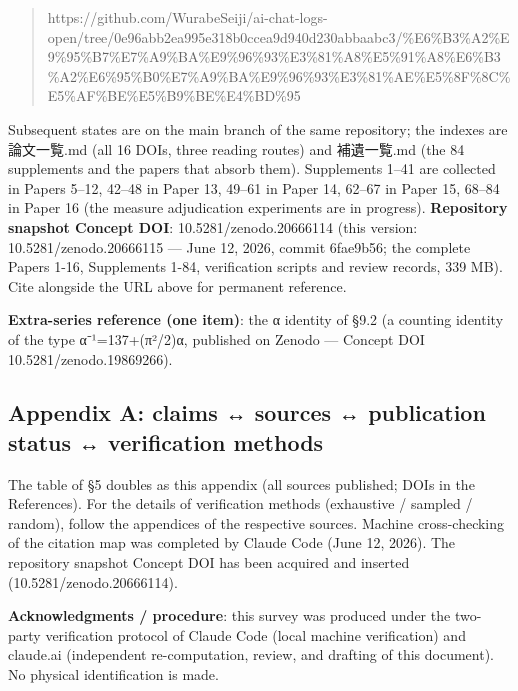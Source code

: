 \documentclass[
]{article}
\begin{document}
\begin{quote}
https://github.com/WurabeSeiji/ai-chat-logs-open/tree/0e96abb2ea995e318b0ccea9d940d230abbaabc3/\%E6\%B3\%A2\%E9\%95\%B7\%E7\%A9\%BA\%E9\%96\%93\%E3\%81\%A8\%E5\%91\%A8\%E6\%B3\%A2\%E6\%95\%B0\%E7\%A9\%BA\%E9\%96\%93\%E3\%81\%AE\%E5\%8F\%8C\%E5\%AF\%BE\%E5\%B9\%BE\%E4\%BD\%95
\end{quote}

Subsequent states are on the main branch of the same repository; the
indexes are 論文一覧.md (all 16 DOIs, three reading routes) and
補遺一覧.md (the 84 supplements and the papers that absorb them).
Supplements 1--41 are collected in Papers 5--12, 42--48 in Paper 13,
49--61 in Paper 14, 62--67 in Paper 15, 68--84 in Paper 16 (the measure
adjudication experiments are in progress). \textbf{Repository snapshot
Concept DOI}: 10.5281/zenodo.20666114 (this version:
10.5281/zenodo.20666115 --- June 12, 2026, commit 6fae9b56; the complete
Papers 1-16, Supplements 1-84, verification scripts and review records,
339 MB). Cite alongside the URL above for permanent reference.

\textbf{Extra-series reference (one item)}: the α identity of §9.2 (a
counting identity of the type α⁻¹=137+(π²/2)α, published on Zenodo ---
Concept DOI 10.5281/zenodo.19869266).

\subsection{Appendix A: claims ↔ sources ↔ publication status ↔
verification
methods}\label{appendix-a-claims-sources-publication-status-verification-methods}

The table of §5 doubles as this appendix (all sources published; DOIs in
the References). For the details of verification methods (exhaustive /
sampled / random), follow the appendices of the respective sources.
Machine cross-checking of the citation map was completed by Claude Code
(June 12, 2026). The repository snapshot Concept DOI has been acquired
and inserted (10.5281/zenodo.20666114).

\textbf{Acknowledgments / procedure}: this survey was produced under the
two-party verification protocol of Claude Code (local machine
verification) and claude.ai (independent re-computation, review, and
drafting of this document). No physical identification is made.
\end{document}
